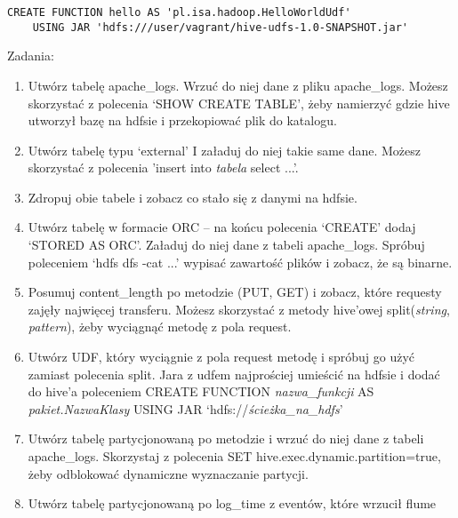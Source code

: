 \documentclass[11pt]{article}
\begin{document}
\begin{lstlisting}
CREATE FUNCTION hello AS 'pl.isa.hadoop.HelloWorldUdf'
	USING JAR 'hdfs:///user/vagrant/hive-udfs-1.0-SNAPSHOT.jar'
\end{lstlisting}

\pagebreak

Zadania:
\begin{enumerate}
\item Utwórz tabelę apache\_logs. Wrzuć do niej dane z pliku apache\_logs. Możesz skorzystać z polecenia ‘SHOW CREATE TABLE’, żeby namierzyć gdzie hive utworzył bazę na hdfsie i przekopiować plik do katalogu.
\item Utwórz tabelę typu ‘external’ I załaduj do niej takie same dane. Możesz skorzystać z polecenia 'insert into \textit{tabela} select ...'.
\item Zdropuj obie tabele i zobacz co stało się z danymi na hdfsie.
\item Utwórz tabelę w formacie ORC – na końcu polecenia ‘CREATE’ dodaj ‘STORED AS ORC’. Załaduj do niej dane z tabeli apache\_logs. Spróbuj poleceniem ‘hdfs dfs -cat ...’ wypisać zawartość plików i zobacz, że są binarne.
\item Posumuj content\_length po metodzie (PUT, GET) i zobacz, które requesty zajęły najwięcej transferu. Możesz skorzystać z metody hive’owej split(\textit{string}, \textit{pattern}), żeby wyciągnąć metodę z pola request.
\item Utwórz UDF, który wyciągnie z pola request metodę i spróbuj go użyć zamiast polecenia split. Jara z udfem najprościej umieścić na hdfsie i dodać do hive’a poleceniem CREATE FUNCTION \textit{nazwa\_funkcji} AS \textit{pakiet.NazwaKlasy} USING JAR ‘hdfs://\textit{ścieżka\_na\_hdfs}’
\item Utwórz tabelę partycjonowaną po metodzie i wrzuć do niej dane z tabeli apache\_logs. Skorzystaj z polecenia SET hive.exec.dynamic.partition=true, żeby odblokować dynamiczne wyznaczanie partycji.
\item Utwórz tabelę partycjonowaną po log_time z eventów, które wrzucił flume
\end{enumerate}
\end{document}

